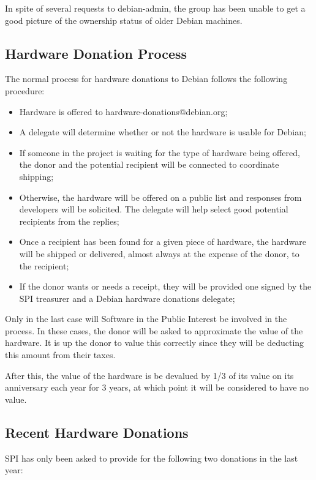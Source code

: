 \documentclass[letterpaper]{report}
\begin{document}
In spite of several requests to debian-admin, the group has been unable
to get a good picture of the ownership status of older Debian machines.


\subsection{Hardware Donation Process}

The normal process for hardware donations to Debian follows the following
procedure:

\begin{itemize}
\item Hardware is offered to hardware-donations@debian.org;
\item A delegate will determine whether or not the hardware is usable for
Debian;
\item If someone in the project is waiting for the type of hardware being
offered, the donor and the potential recipient will be connected to
coordinate shipping;
\item Otherwise, the hardware will be offered on a public list and responses
from developers will be solicited. The delegate will help select good
potential recipients from the replies;
\item Once a recipient has been found for a given piece of hardware, the
hardware will be shipped or delivered, almost always at the expense
of the donor, to the recipient;
\item If the donor wants or needs a receipt, they will be provided one signed
by the SPI treasurer and a Debian hardware donations delegate;
\end{itemize}

Only in the last case will Software in the Public Interest be involved
in the process. In these cases, the donor will be asked to approximate
the value of the hardware. It is up the donor to value this correctly
since they will be deducting this amount from their taxes.

After this, the value of the hardware is be devalued by 1/3 of its
value on its anniversary each year for 3 years, at which point it
will be considered to have no value.


\subsection{Recent Hardware Donations}

SPI has only been asked to provide for the following two donations
in the last year:
\end{document}
